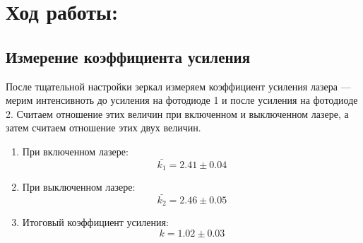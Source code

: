 \section*{Ход работы:}
\subsection*{Измерение коэффициента усиления}
После тщательной настройки зеркал измеряем коэффициент усиления лазера --- мерим интенсивноть до усиления на фотодиоде 1 и после усиления на фотодиоде 2. Считаем отношение этих величин при включенном и выключенном лазере, а затем считаем отношение этих двух величин.
    \begin{enumerate}
        \item При включенном лазере: \\
    \[\bar{k_1} = 2.41 \pm 0.04 \]
    
    \item При выключенном лазере: \\
    \[\bar{k_2} = 2.46 \pm 0.05 \]
    
    \item Итоговый коэффициент усиления:
    \[ k = 1.02 \pm 0.03 \]
    \end{enumerate}
    

